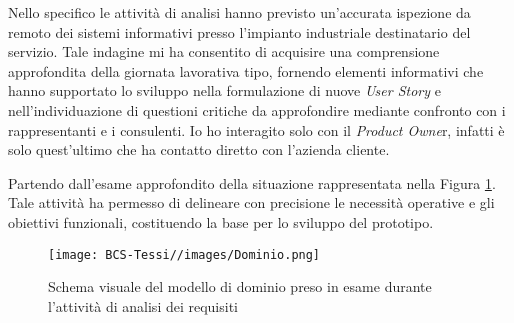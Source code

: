         \vspace{0.2 em}
        \noindent Nello specifico le attività di analisi hanno previsto un'accurata ispezione da remoto dei sistemi informativi presso l'impianto industriale destinatario del servizio. Tale indagine mi ha consentito di acquisire una comprensione approfondita della giornata lavorativa tipo, fornendo elementi informativi che hanno supportato lo sviluppo nella formulazione di nuove \textit{User Story} e nell'individuazione di questioni critiche da approfondire mediante confronto con i rappresentanti e i consulenti. Io ho interagito solo con il \textit{Product Owne}r, infatti è solo quest'ultimo che ha contatto diretto con l'azienda cliente.

        \vspace{0.2 em}
        \noindent Partendo dall'esame approfondito della situazione rappresentata nella Figura \ref{fig:Dominio}. Tale attività ha permesso di delineare con precisione le necessità operative e gli obiettivi funzionali, costituendo la base per lo sviluppo del prototipo.

        \begin{figure}
            \centering
            \texttt{[image: BCS-Tessi//images/Dominio.png]}
            \caption[Modello di dominio preso in esame]{Schema visuale del modello di dominio preso in esame durante l'attività di analisi dei requisiti}
            \label{fig:Dominio}
        \end{figure}

